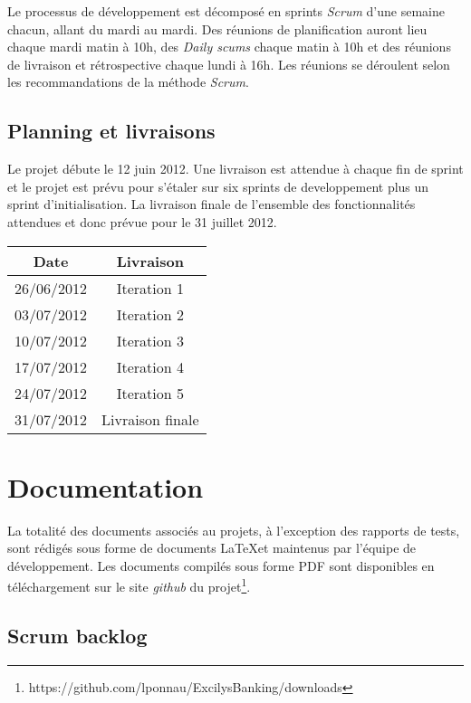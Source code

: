 \documentclass[11pt]{article}
\begin{document}
Le processus de développement est décomposé en sprints \emph{Scrum} d'une semaine
chacun, allant du mardi au mardi. Des réunions de planification auront lieu
chaque mardi matin à 10h, des \emph{Daily scums} chaque matin à 10h et des
réunions de livraison et rétrospective chaque lundi à 16h. Les réunions
se déroulent selon les recommandations de la méthode \emph{Scrum}.\\

\subsection{Planning et livraisons}

Le projet débute le 12 juin 2012. Une livraison est attendue à chaque fin de
sprint et le projet est prévu pour s'étaler sur six sprints de developpement
plus un sprint d'initialisation. La livraison finale de l'ensemble des
fonctionnalités attendues et donc prévue pour le 31 juillet 2012.

\begin{center}
\begin{tabular}{ | c | c | }
\hline \textbf{Date} & \textbf{Livraison} \\
\hline 26/06/2012 & Iteration 1 \\
\hline 03/07/2012 & Iteration 2 \\
\hline 10/07/2012 & Iteration 3 \\
\hline 17/07/2012 & Iteration 4 \\
\hline 24/07/2012 & Iteration 5 \\
\hline 31/07/2012 & Livraison finale \\ \hline
\end{tabular}
\end{center}

\section{Documentation}

La totalité des documents associés au projets, à l'exception des rapports de
tests, sont rédigés sous forme de documents \LaTeX et maintenus par l'équipe de
développement. Les documents compilés sous forme PDF sont disponibles en
téléchargement sur le site \emph{github} du projet\footnote{https://github.com/lponnau/ExcilysBanking/downloads}.

\subsection{Scrum backlog}
\end{document}

